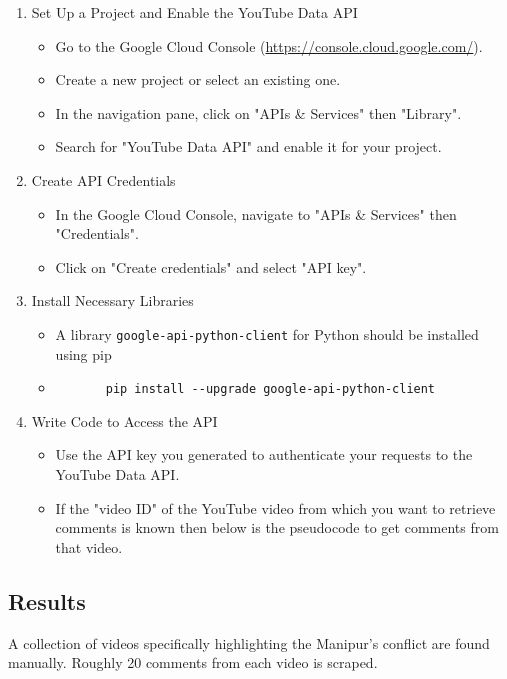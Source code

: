 \documentclass{report}
\begin{document}
\begin{enumerate}
\item Set Up a Project and Enable the YouTube Data API
\begin{itemize}
\item Go to the Google Cloud Console (\url{https://console.cloud.google.com/}).
\item Create a new project or select an existing one.
\item In the navigation pane, click on "APIs \& Services" then "Library".
\item Search for "YouTube Data API" and enable it for your project.
\end{itemize}
\item Create API Credentials
\begin{itemize}
\item In the Google Cloud Console, navigate to "APIs \& Services" then "Credentials".
\item Click on "Create credentials" and select "API key".
\end{itemize}
\item Install Necessary Libraries
\begin{itemize}
\item A library \texttt{google-api-python-client} for Python should be installed using pip
\item \begin{verbatim}
       pip install --upgrade google-api-python-client
       \end{verbatim}
\end{itemize}
\item Write Code to Access the API
\begin{itemize}
\item Use the API key you generated to authenticate your requests to the YouTube Data API.
\item If the "video ID" of the YouTube video from which you want to retrieve comments is known then below is the pseudocode to get comments from that video.
\end{itemize}
\end{enumerate}
\subsection{Results}
A collection of videos specifically highlighting the Manipur's conflict are found manually. Roughly 20 comments from each video is scraped.
\end{document}
